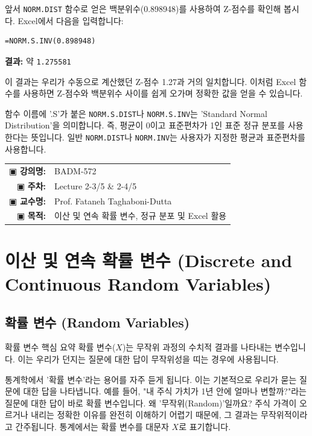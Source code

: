 \documentclass[11pt,a4paper]{article}
\makeatletter
\theoremstyle{definition}
\newcommand{\metainfo}[4]{
\begin{tcolorbox}[
    colback=lightpurple,
    colframe=darkpurple,
    boxrule=1pt,
    arc=2mm,
    left=10pt,
    right=10pt,
    top=8pt,
    bottom=8pt
]
\begin{tabular}{@{}rl@{}}
▣ \textbf{강의명:} & #1 \\[0.3em]
▣ \textbf{주차:} & #2 \\[0.3em]
▣ \textbf{교수명:} & #3 \\[0.3em]
▣ \textbf{목적:} & \begin{minipage}[t]{0.75\textwidth}#4\end{minipage}
\end{tabular}
\end{tcolorbox}
}
\makeatother
\begin{document}
\begin{examplebox}[title=NORM.S.INV 함수 적용]
앞서 \texttt{NORM.DIST} 함수로 얻은 백분위수(0.898948)를 사용하여 Z-점수를 확인해 봅시다.
Excel에서 다음을 입력합니다:
\begin{lstlisting}[language=Excel, caption={NORM.S.INV 함수를 이용한 Z-점수 확인}, label={lst:norm_s_inv_example}]
=NORM.S.INV(0.898948)
\end{lstlisting}
\textbf{결과:} 약 \texttt{1.275581}

이 결과는 우리가 수동으로 계산했던 Z-점수 1.27과 거의 일치합니다. 이처럼 Excel 함수를 사용하면 Z-점수와 백분위수 사이를 쉽게 오가며 정확한 값을 얻을 수 있습니다.

\begin{infobox}[title=NORM.S.DIST와 NORM.S.INV의 'S' 의미]
함수 이름에 '.S'가 붙은 \texttt{NORM.S.DIST}나 \texttt{NORM.S.INV}는 'Standard Normal Distribution'을 의미합니다. 즉, 평균이 0이고 표준편차가 1인 표준 정규 분포를 사용한다는 뜻입니다. 일반 \texttt{NORM.DIST}나 \texttt{NORM.INV}는 사용자가 지정한 평균과 표준편차를 사용합니다.
\end{infobox}
\end{examplebox}

\newpage

\thispagestyle{firstpage}

\metainfo{BADM-572}{Lecture 2-3/5 \& 2-4/5}{Prof. Fataneh Taghaboni-Dutta}{이산 및 연속 확률 변수, 정규 분포 및 Excel 활용}

\tableofcontents

\newpage

\section{이산 및 연속 확률 변수 (Discrete and Continuous Random Variables)}

\subsection{확률 변수 (Random Variables)}

\begin{summarybox}{확률 변수 핵심 요약}
확률 변수(\(X\))는 무작위 과정의 수치적 결과를 나타내는 변수입니다. 이는 우리가 던지는 질문에 대한 답이 무작위성을 띠는 경우에 사용됩니다.
\end{summarybox}

통계학에서 '확률 변수'라는 용어를 자주 듣게 됩니다. 이는 기본적으로 우리가 묻는 질문에 대한 답을 나타냅니다. 예를 들어, "내 주식 가치가 1년 안에 얼마나 변할까?"라는 질문에 대한 답이 바로 확률 변수입니다. 왜 '무작위(Random)'일까요? 주식 가격이 오르거나 내리는 정확한 이유를 완전히 이해하기 어렵기 때문에, 그 결과는 무작위적이라고 간주됩니다. 통계에서는 확률 변수를 대문자 \(X\)로 표기합니다.
\end{document}
